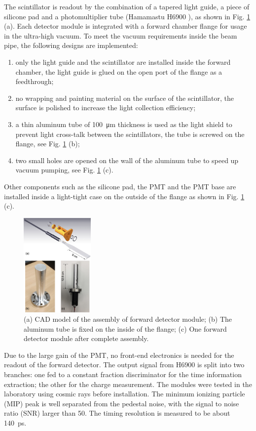 \documentclass[number,5p]{elsarticle}
\begin{document}
The scintillator is readout by the combination of a tapered light guide, a piece of silicone pad and a
photomultiplier tube (Hamamastu H6900 \cite{hamamatsu}), as shown in Fig. \ref{fig:forward_module} (a).
Each detector module is integrated with a forward chamber flange for usage
in the ultra-high vacuum.
To meet the vacuum requirements inside the beam pipe, the following designs are implemented:
\begin{enumerate}
\item only the light guide and the scintillator are installed inside the forward chamber, the light guide is glued on the open port of the flange as a feedthrough;
\item no wrapping and painting material on the surface of the scintillator, the
  surface is polished to increase the light collection efficiency;
\item a thin aluminum tube of \SI{100}{\micro\meter} thickness is used as
  the light shield to prevent light cross-talk between the scintillators, the tube is screwed on the flange, see Fig. \ref{fig:forward_module} (b);
\item two small holes are opened on the wall of the aluminum tube to speed up vacuum pumping, see Fig. \ref{fig:forward_module} (c).
\end{enumerate}
Other components such as the silicone pad, the PMT and the PMT base are installed inside a light-tight case on the outside of the flange as shown in Fig. \ref{fig:forward_module} (c).
\begin{figure}[htbp]
  \centering
  \includegraphics[width=0.32\textwidth]{./forward_module.png}
  \caption{(a) CAD model of the assembly of forward detector module; (b) The aluminum tube is fixed on the inside of the flange; (c) One forward detector module after complete assembly.}
  \label{fig:forward_module}
\end{figure}

Due to the large gain of the PMT, no front-end electronics is needed for the readout of the forward detector.
The output signal from H6900 is split into two branches: one fed to a
constant fraction discriminator for the time information extraction; the other
for the charge measurement.
The modules were tested in the laboratory using cosmic rays before installation.
The minimum ionizing particle (MIP) peak is well separated from the pedestal
noise, with the signal to noise ratio (SNR) larger than 50.
The timing resolution is measured to be about \SI{140}{\pico\second}.
\end{document}

